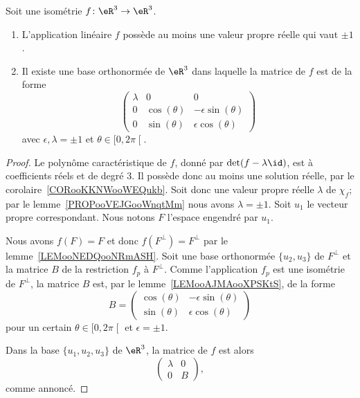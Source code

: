 \begin{proposition}      \label{PROPooOMORooWzsrDB}
	Soit une isométrie \( f\colon \eR^3\to \eR^3\).
	\begin{enumerate}
		\item
		      L'application linéaire \( f\) possède au moins une valeur propre réelle qui vaut \( \pm 1\).
		\item
		      Il existe une base orthonormée de \( \eR^3\) dans laquelle la matrice de \( f\) est de la forme
		      \begin{equation}
			      \begin{pmatrix}
				      \lambda & 0            & 0                      \\
				      0       & \cos(\theta) & -\epsilon\sin(\theta)  \\
				      0       & \sin(\theta) & \epsilon\cos(\theta)
			      \end{pmatrix}
		      \end{equation}
		      avec \( \epsilon,\lambda=\pm 1\) et \( \theta\in \mathopen[ 0 , 2\pi \mathclose[\).
	\end{enumerate}
\end{proposition}

\begin{proof}
	Le polynôme caractéristique de \( f\), donné par \( \det(f-\lambda\id)\), est à coefficients réels et de degré \( 3\). Il possède donc au moins une solution réelle, par le corolaire~\ref{CORooKKNWooWEQukb}. Soit donc une valeur propre réelle \( \lambda\) de \( \chi_f\); par le lemme~\ref{PROPooVEJGooWnqtMm} nous avons \( \lambda=\pm 1\). Soit \( u_1\) le vecteur propre correspondant. Nous notons \( F\) l'espace engendré par \( u_1\).

	Nous avons \( f(F)=F\) et donc \( f(F^{\perp})=F^{\perp}\) par le lemme~\ref{LEMooNEDQooNRmASH}. Soit une base orthonormée \( \{ u_2,u_3 \}\) de \( F^{\perp}\) et la matrice \( B\) de la restriction \( f_{p}\) à \( F^{\perp}\). Comme l'application \( f_p\) est une isométrie de \( F^{\perp}\), la matrice \( B\) est, par le lemme~\ref{LEMooAJMAooXPSKtS}, de la forme
	\begin{equation}
		B=\begin{pmatrix}
			\cos(\theta) & -\epsilon\sin(\theta)  \\
			\sin(\theta) & \epsilon\cos(\theta)
		\end{pmatrix}
	\end{equation}
	pour un certain \( \theta\in\mathopen[ 0 , 2\pi \mathclose[\) et \( \epsilon=\pm 1\).

	Dans la base \( \{u_1,u_2,u_3\}\) de \( \eR^3\), la matrice de \( f\) est alors
	\begin{equation}
		\begin{pmatrix}
			\lambda & 0 \\
			0       & B
		\end{pmatrix},
	\end{equation}
	comme annoncé.
\end{proof}

